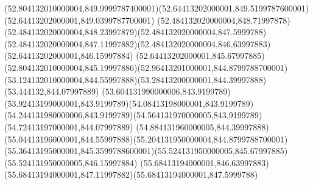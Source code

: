 {{	\curveto(52.804132010000004,849.9999787400001)(52.64413202000001,849.5199787600001)(52.64413202000001,849.0399787700001)
	\curveto(52.484132020000004,848.71997878)(52.484132020000004,848.23997879)(52.484132020000004,847.5999788)
	\curveto(52.484132020000004,847.11997882)(52.484132020000004,846.63997883)(52.64413202000001,846.15997884)
	\curveto(52.64413202000001,845.67997885)(52.804132010000004,845.19997886)(52.96413201000001,844.8799788700001)
	\curveto(53.124132010000004,844.55997888)(53.28413200000001,844.39997888)(53.444132,844.07997889)
	\curveto(53.604131990000006,843.9199789)(53.92413199000001,843.9199789)(54.08413198000001,843.9199789)
	\curveto(54.244131980000006,843.9199789)(54.564131970000005,843.9199789)(54.72413197000001,844.07997889)
	\curveto(54.884131960000005,844.39997888)(55.04413196000001,844.55997888)(55.204131950000004,844.8799788700001)
	\curveto(55.36413195000001,845.3599788600001)(55.524131950000005,845.67997885)(55.524131950000005,846.15997884)
	\curveto(55.68413194000001,846.63997883)(55.68413194000001,847.11997882)(55.68413194000001,847.5999788)
	\closepath
}
}

